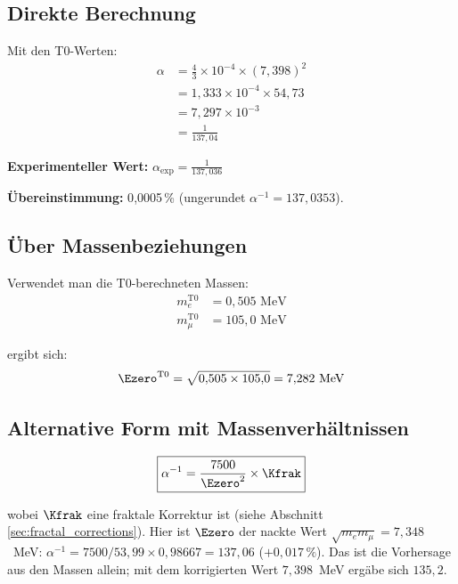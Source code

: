 	\subsection{Direkte Berechnung}
	
	Mit den T0-Werten:
	\begin{align}
		\alpha &= \frac{4}{3} \times 10^{-4} \times (7{,}398)^2\\
		&= 1{,}333 \times 10^{-4} \times 54{,}73\\
		&= 7{,}297 \times 10^{-3}\\
		&= \frac{1}{137{,}04}
	\end{align}
	
	\textbf{Experimenteller Wert:} $\alpha_{\text{exp}} = \frac{1}{137{,}036}$
	
	\textbf{Übereinstimmung:} 0{,}0005\,\% (ungerundet $\alpha^{-1} = 137{,}0353$).
	
	\subsection{Über Massenbeziehungen}
	
	Verwendet man die T0-berechneten Massen:
	\begin{align}
		m_e^{\text{T0}} &= 0{,}505 \text{ MeV}\\
		m_\mu^{\text{T0}} &= 105{,}0 \text{ MeV}
	\end{align}
	
	ergibt sich:
	\begin{equation}
		\Ezero^{\text{T0}} = \sqrt{0{,}505 \times 105{,}0} = 7{,}282 \text{ MeV}
	\end{equation}
	
	\subsection{Alternative Form mit Massenverhältnissen}
	
	\begin{equation}
		\boxed{\alpha^{-1} = \frac{7500}{\Ezero^2} \times \Kfrak}
		\label{eq:alpha_inverse_form}
	\end{equation}
	
	wobei $\Kfrak$ eine fraktale Korrektur ist (siehe Abschnitt \ref{sec:fractal_corrections}). Hier ist $\Ezero$ der nackte Wert $\sqrt{m_e m_\mu} = 7{,}348$~MeV: $\alpha^{-1} = 7500/53{,}99 \times 0{,}98667 = 137{,}06$ ($+0{,}017\,\%$). Das ist die Vorhersage aus den Massen allein; mit dem korrigierten Wert $7{,}398$~MeV ergäbe sich $135{,}2$.

